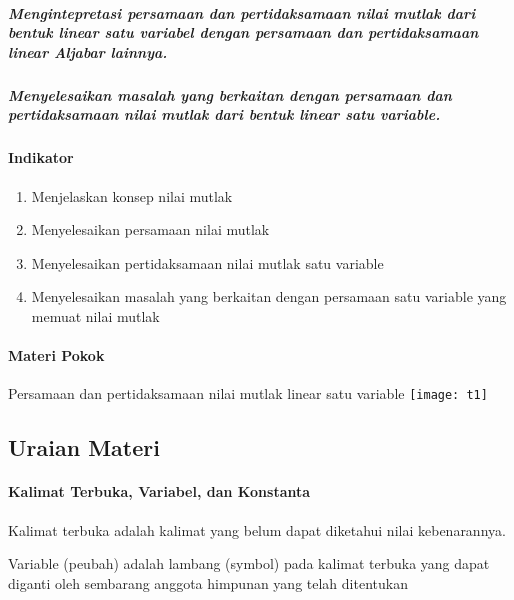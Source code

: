 \documentclass[11pt,fleqn]{book} %
\begin{document}
\subparagraph{ Mengintepretasi persamaan dan pertidaksamaan nilai mutlak dari bentuk linear satu variabel dengan persamaan dan pertidaksamaan linear Aljabar lainnya.}


\subparagraph{ Menyelesaikan masalah yang berkaitan dengan persamaan dan pertidaksamaan nilai mutlak dari bentuk linear satu variable.}


\paragraph{ Indikator}

\begin{enumerate}
\item \textbf{ }Menjelaskan konsep nilai mutlak\textbf{}

\item \textbf{ }Menyelesaikan persamaan nilai mutlak\textbf{}

\item \textbf{ }Menyelesaikan pertidaksamaan nilai mutlak satu variable\textbf{}

\item \textbf{ }Menyelesaikan masalah yang berkaitan dengan persamaan satu variable yang memuat nilai mutlak\textbf{}
\end{enumerate}


\paragraph{ Materi Pokok}

\noindent Persamaan dan pertidaksamaan nilai mutlak linear satu variable
\noindent
\noindent
\texttt{[image: t1]}

\noindent 


\subsection{ Uraian Materi}


\paragraph{ Kalimat Terbuka, Variabel, dan Konstanta}

Kalimat terbuka adalah kalimat yang belum dapat diketahui nilai kebenarannya.

\noindent Variable (peubah) adalah lambang (symbol) pada kalimat terbuka yang dapat diganti oleh sembarang anggota himpunan yang telah ditentukan
\end{document}
